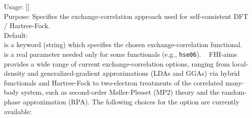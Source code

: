 {
 \noindent
 Usage:   [] \\[1.0ex]
 Purpose: Specifies the exchange-correlation approach used for self-consistent
 DFT / Hartree-Fock. \\[1.0ex]
 Default:  \\[1.0ex]
  is a keyword (string) which specifies the chosen
    exchange-correlation functional. \\
  is a real parameter needed only for some functionals
 (e.g., \texttt{hse06}). \
}
FHI-aims provides a wide range of current exchange-correlation options,
ranging from local-density and generalized-gradient approximations (LDAs and
GGAs) via hybrid functionals and Hartree-Fock to two-electron
treatments of the correlated many-body system, such as second-order
M{\o}ller-Plesset (MP2) theory and the random-phase approximation (RPA). The
following choices for the \option{xc-type} option are currently available:
